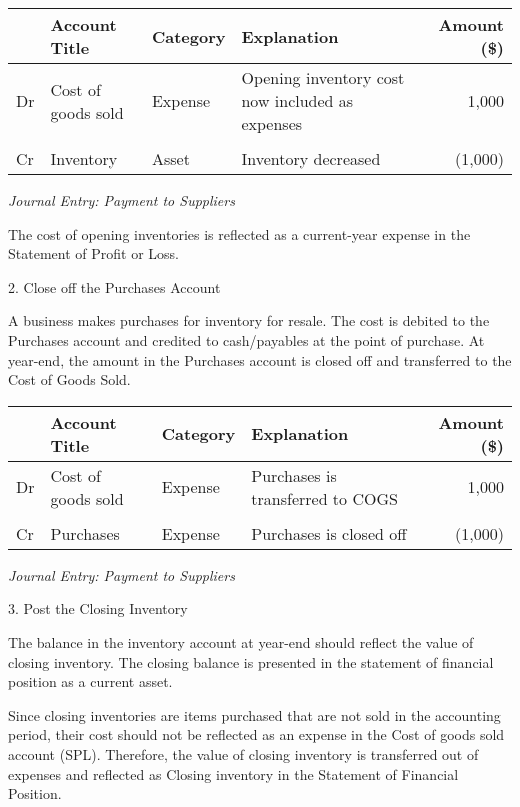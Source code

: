\begin{center} 
\begin{tabular}{@{} l l l l r @{}}
\toprule
& \textbf{Account Title} & \textbf{Category} & \textbf{Explanation} & \textbf{Amount (\$)} \\
\midrule
Dr & Cost of goods sold & Expense & Opening inventory cost now included as expenses & 1,000 \\
 & \quad  & \\
Cr & Inventory & Asset & Inventory decreased & (1,000) \\
\bottomrule
\end{tabular}
\end{center}
\vspace{1em}
\textit{Journal Entry: Payment to Suppliers}

The cost of opening inventories is reflected as a current-year expense in the Statement of Profit or Loss.

2. Close off the Purchases Account

A business makes purchases for inventory for resale. The cost is debited to the Purchases account and credited to cash/payables at the point of purchase. At year-end, the amount in the Purchases account is closed off and transferred to the Cost of Goods Sold.


\begin{center} 
\begin{tabular}{@{} l l l l r @{}}
\toprule
& \textbf{Account Title} & \textbf{Category} & \textbf{Explanation} & \textbf{Amount (\$)} \\
\midrule
Dr & Cost of goods sold & Expense & Purchases is transferred to COGS & 1,000 \\
 & \quad  & \\
Cr & Purchases & Expense & Purchases is closed off & (1,000) \\
\bottomrule
\end{tabular}
\end{center}
\vspace{1em}
\textit{Journal Entry: Payment to Suppliers}


3. Post the Closing Inventory

The balance in the inventory account at year-end should reflect the value of closing inventory. The closing balance is presented in the statement of financial position as a current asset.

Since closing inventories are items purchased that are not sold in the accounting period, their cost should not be reflected as an expense in the Cost of goods sold account (SPL). Therefore, the value of closing inventory is transferred out of expenses and reflected as Closing inventory in the Statement of Financial Position.

